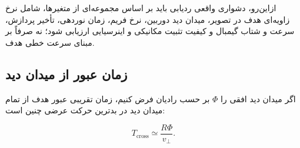 \documentclass[12pt,a4paper]{article}
\begin{document}
ازاین‌رو، دشواری واقعی ردیابی باید بر اساس مجموعه‌ای از متغیرها،
شامل نرخ زاویه‌ای هدف در تصویر، میدان دید دوربین، نرخ فریم، زمان
نوردهی، تأخیر پردازش، سرعت و شتاب گیمبال و کیفیت تثبیت مکانیکی و
اینرسیایی ارزیابی شود؛ نه صرفاً بر مبنای سرعت خطی هدف.






\subsection{زمان عبور از میدان دید}

اگر میدان دید افقی را $\Phi$ بر حسب رادیان فرض کنیم، زمان تقریبی عبور هدف از تمام میدان دید در بدترین حرکت عرضی چنین است:


\begin{equation}
	T_{\mathrm{cross}}
	\simeq
	\frac{R\Phi}{v_{\perp}}.
	\label{eq:crossing}
\end{equation}

\begin{table}[H]
	\centering
	\caption{زمان عبور از میدان دید و تعداد فریم قابل مشاهده برای سرعت عرضی }
	\label{tab:crossing}
	
\end{table}
\end{document}
